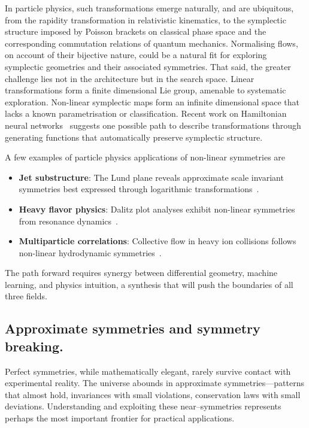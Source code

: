         In particle physics, such transformations emerge naturally, and are ubiquitous, from the rapidity transformation in relativistic kinematics, to the symplectic structure imposed by Poisson brackets on classical phase space and the corresponding commutation relations of quantum mechanics.
        Normalising flows, on account of their bijective nature, could be a natural fit for exploring symplectic geometries and their associated symmetries.
        That said, the greater challenge lies not in the architecture but in the search space.
        Linear transformations form a finite dimensional Lie group, amenable to systematic exploration.
        Non-linear symplectic maps form an infinite dimensional space that lacks a known parametrisation or classification.
        Recent work on Hamiltonian neural networks~\cite{greydanus_hamiltonian_2019} suggests one possible path to describe transformations through generating functions that automatically preserve symplectic structure.
        
        A few examples of particle physics applications of non-linear symmetries are
        \begin{itemize}
            \item \textbf{Jet substructure}: The Lund plane reveals approximate scale invariant symmetries best expressed through logarithmic transformations~\cite{Dreyer:2018nbf}.
            \item \textbf{Heavy flavor physics}: Dalitz plot analyses exhibit non-linear symmetries from resonance dynamics~\cite{Asner:2003gh}.
            \item \textbf{Multiparticle correlations}: Collective flow in heavy ion collisions follows non-linear hydrodynamic symmetries~\cite{Yan:2015lwn}.
        \end{itemize}
        The path forward requires synergy between differential geometry, machine learning, and physics intuition, a synthesis that will push the boundaries of all three fields.
    
    \subsection{Approximate symmetries and symmetry breaking.}
        Perfect symmetries, while mathematically elegant, rarely survive contact with experimental reality.
        The universe abounds in approximate symmetries---patterns that almost hold, invariances with small violations, conservation laws with small deviations.
        Understanding and exploiting these near--symmetries represents perhaps the most important frontier for practical applications.
        
